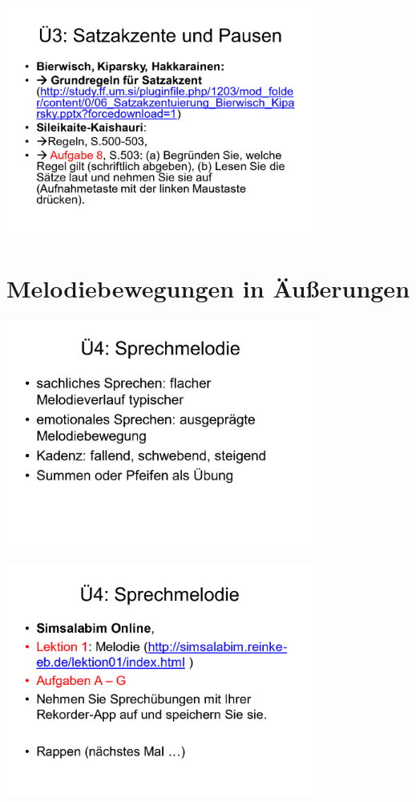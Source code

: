 \documentclass[
  letterpaper,
]{scrbook}
\begin{document}
\includegraphics[width=4in,height=\textheight]{./pictures/sprachlabor/Phonetikuebungen_S01_Page7.png}

\hypertarget{sec-satzmelodie}{%
\chapter{Melodiebewegungen in Äußerungen}\label{sec-satzmelodie}}

\includegraphics[width=4in,height=\textheight]{./pictures/sprachlabor/Phonetikuebungen_S01_Page8.png}

\includegraphics[width=4in,height=\textheight]{./pictures/sprachlabor/Phonetikuebungen_S01_Page9.png}
\end{document}
